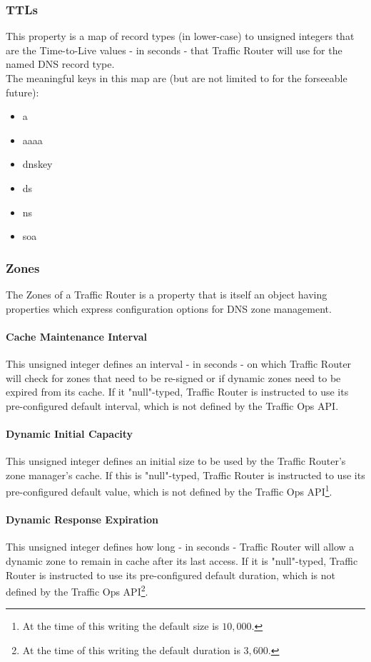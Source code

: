 \subsubsection{TTLs}
This property is a map of record types (in lower-case) to unsigned integers that
are the Time-to-Live values - in seconds - that Traffic Router will use for the named
DNS record type.\\
The meaningful keys in this map are (but are not limited to for the forseeable
future):

\begin{itemize}
	\item a
	\item aaaa
	\item dnskey
	\item ds
	\item ns
	\item soa
\end{itemize}

\subsubsection{Zones}
The Zones of a Traffic Router is a property that is itself an object having
properties which express configuration options for DNS zone management.

\paragraph{Cache Maintenance Interval}
This unsigned integer defines an interval - in seconds - on which Traffic Router
will check for zones that need to be re-signed or if dynamic zones need to be
expired from its cache. If it "null"-typed, Traffic Router is instructed to use
its pre-configured default interval, which is not defined by the Traffic Ops
API.

\paragraph{Dynamic Initial Capacity}
This unsigned integer defines an initial size to be used by the Traffic Router's
zone manager's cache. If this is "null"-typed, Traffic Router is instructed to
use its pre-configured default value, which is not defined by the Traffic Ops
API\footnote{At the time of this writing the default size is $10,000$.}.

\paragraph{Dynamic Response Expiration}
This unsigned integer defines how long - in seconds - Traffic Router will allow
a dynamic zone to remain in cache after its last access. If it is "null"-typed,
Traffic Router is instructed to use its pre-configured default duration, which
is not defined by the Traffic Ops API\footnote{At the time of this writing the
default duration is $3,600$.}.

